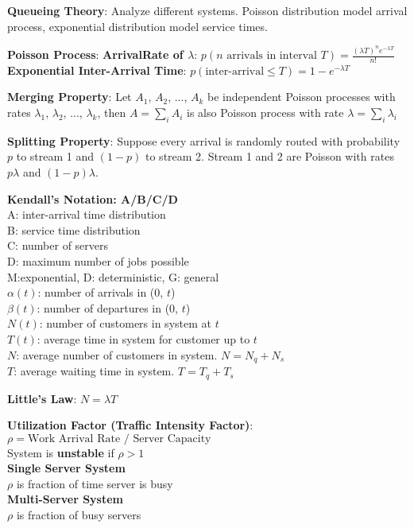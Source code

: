 \documentclass{scrartcl}
\begin{document}
\begin{multicols*}{3}
{\bf Queueing Theory}: Analyze different systems. Poisson distribution model arrival process, exponential distribution model service times.

{\bf Poisson Process}: {\bf ArrivalRate of $\lambda$}: $p(n\text{ arrivals in interval } T)=\frac{(\lambda T)^ne^{-\lambda T}}{n!}$\\
{\bf Exponential Inter-Arrival Time}: $p(\text{inter-arrival}\leq T) = 1-e^{-\lambda T}$

{\bf Merging Property}: Let $A_1$, $A_2$, ..., $A_k$ be independent Poisson processes with rates $\lambda_1$, $\lambda_2$, ..., $\lambda_k$, then $A=\sum_iA_i$ is also Poisson process with rate $\lambda=\sum_i\lambda_i$

{\bf Splitting Property}: Suppose every arrival is randomly routed with probability $p$ to stream 1 and $(1-p)$ to stream 2. Stream 1 and 2 are Poisson with rates $p\lambda$ and $(1-p)\lambda$.

{\bf Kendall's Notation: A/B/C/D} \\
A: inter-arrival time distribution\\
B: service time distribution\\
C: number of servers\\
D: maximum number of jobs possible\\
M:exponential, D: deterministic, G: general\\

$\alpha(t)$: number of arrivals in (0, $t$)\\
$\beta(t)$: number of departures in (0, $t$)\\
$N(t)$: number of customers in system at $t$\\
$T(t)$: average time in system for customer up to $t$\\
$N$: average number of customers in system. $N=N_q+N_s$\\
$T$: average waiting time in system. $T=T_q+T_s$

{\bf Little's Law}: $N=\lambda T$

{\bf Utilization Factor (Traffic Intensity Factor)}: $\rho=\text{Work Arrival Rate } / \text{ Server Capacity}$\\
System is {\bf unstable} if $\rho>1$\\
{\bf Single Server System} \\ $\rho$ is fraction of time server is busy\\
{\bf Multi-Server System} \\ $\rho$ is fraction of busy servers



\end{multicols*}
\end{document}
